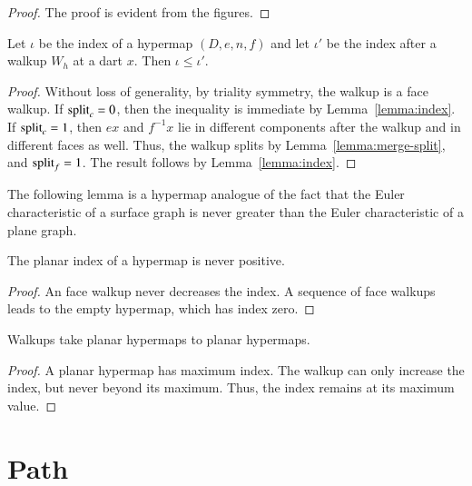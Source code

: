 \begin{proof} The proof is evident from the figures.
\end{proof}

\begin{lemma}\label{lemma:planar-index2}
Let $\iota$ be the index of a hypermap $(D,e,n,f)$ and let $\iota'$
be the index after a walkup $W_h$ at a dart $x$.  Then $\iota \le
\iota'$.
\end{lemma} 


\begin{proof} Without loss of generality, by triality symmetry, the
walkup is a face walkup.  If ${\operatorname{split}}_c=0$, then the inequality is
immediate by Lemma~\ref{lemma:index}.  If ${\operatorname{split}}_c=1$, 
then $e x$ and $f^{-1} x$ lie in
different components after the walkup and in different
faces as well.  Thus, the walkup splits by Lemma~\ref{lemma:merge-split}, and
  ${\operatorname{split}}_f = 1$.  The result
follows by Lemma~\ref{lemma:index}.
\end{proof}

The following lemma is a hypermap analogue of the fact that the Euler characteristic
of a surface graph is never greater than the Euler characteristic of a plane graph.

\begin{lemma}
\label{lemma:planar-nonpos}  
The planar index
of a hypermap is never positive.
\end{lemma}

\begin{proof}  An face walkup never decreases the index.  A sequence
of face walkups leads to the empty hypermap, which has
index zero.
\end{proof}


\begin{lemma}
\label{lemma:walkup-planar}
Walkups take planar hypermaps to planar
hypermaps.
\end{lemma}

\begin{proof}  
A planar hypermap has maximum index.  The walkup
can only increase the index, but never beyond its maximum.  
Thus, the index remains at its maximum value.
\end{proof}





\section{Path}

